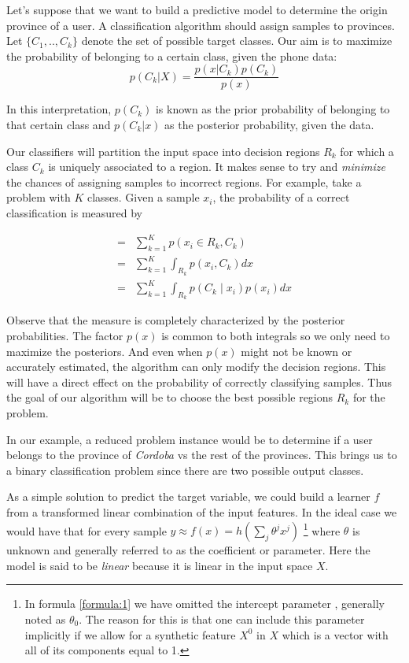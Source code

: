 Let's suppose that we want to build a predictive model to determine the origin province of a user. A classification algorithm should assign samples to provinces. Let $\{C_1,..,C_k\}$ denote the set of possible target classes. Our aim is to maximize the probability of belonging to a certain class, given the phone data:
\begin{equation}
p(C_k| X) = \frac{p(x|C_k)p(C_k)}{p(x)} 
\end{equation}

In this interpretation, $p(C_k)$ is known as the prior probability of belonging to that certain class and $p(C_k|x)$ as the posterior probability, given the data.

Our classifiers will partition the input space into decision regions $R_k$ for which a class $C_k$ is uniquely associated to a region. It makes sense to try and \textit{minimize} the chances of assigning samples to incorrect regions. For example, take a problem with $K$ classes. Given a sample $x_i$, the probability of a correct classification is measured by

\begin{equation}\label{eq:goodclassification-equation}
\begin{split}
=  & \sum_{k=1}^{K} p(x_i \in R_k, C_k )  \\
=  & \sum_{k=1}^{K} \int_{R_k}p(x_i,C_k) dx \\
=  & \sum_{k=1}^{K} \int_{R_k}p(C_k \mid x_i) p(x_i) dx
\end{split}
\end{equation}

Observe that the measure is completely characterized by the posterior probabilities. The factor $p(x)$ is common to both integrals so we only need to maximize the posteriors. And even when $p(x)$ might not be known or accurately estimated, the algorithm can only modify the decision regions. This will have a direct effect on the probability of correctly classifying samples. Thus the goal of our algorithm will be to choose the best possible regions $R_k$ for the problem.

In our example, a reduced problem instance would be to determine if a user belongs to the province of \textit{Cordoba} vs the rest of the provinces. This brings us to a binary classification problem since there are two possible output classes. %

As a simple solution to predict the target variable, we could build a learner $f$ from a transformed linear combination of the input features. In the ideal case we would have that for every sample $y \approx f(x) = h\left(\sum_{j}\theta^jx^j\right)$ \label{formula:1} \footnote{In formula \ref{formula:1} we have omitted the intercept parameter , generally noted as $\theta_0$. The reason for this is that one can include this parameter implicitly if we allow for a synthetic feature $X^0$ in $X$ which is a vector with all of its components equal to 1.  } where $\theta$ is unknown and generally referred to as the coefficient or parameter. Here the model is said to be \textit{linear} because it is linear in the input space $X$.

